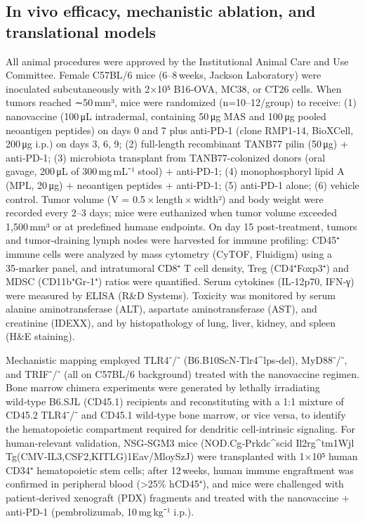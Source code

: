 \documentclass{article}
\begin{document}
\subsection{In vivo efficacy, mechanistic ablation, and translational models}
All animal procedures were approved by the Institutional Animal Care and Use Committee. Female C57BL/6 mice (6–8 weeks, Jackson Laboratory) were inoculated subcutaneously with 2×10⁵ B16‑OVA, MC38, or CT26 cells. When tumors reached ∼50 mm³, mice were randomized (n=10–12/group) to receive: (1) nanovaccine (100 μL intradermal, containing 50 μg MAS and 100 μg pooled neoantigen peptides) on days 0 and 7 plus anti‑PD‑1 (clone RMP1‑14, BioXCell, 200 μg i.p.) on days 3, 6, 9; (2) full‑length recombinant TANB77 pilin (50 μg) + anti‑PD‑1; (3) microbiota transplant from TANB77-colonized donors (oral gavage, 200 μL of 300 mg mL⁻¹ stool) + anti‑PD‑1; (4) monophosphoryl lipid A (MPL, 20 μg) + neoantigen peptides + anti‑PD‑1; (5) anti‑PD‑1 alone; (6) vehicle control. Tumor volume (V = 0.5 × length × width²) and body weight were recorded every 2–3 days; mice were euthanized when tumor volume exceeded 1,500 mm³ or at predefined humane endpoints. On day 15 post‑treatment, tumors and tumor‑draining lymph nodes were harvested for immune profiling: CD45⁺ immune cells were analyzed by mass cytometry (CyTOF, Fluidigm) using a 35‑marker panel, and intratumoral CD8⁺ T cell density, Treg (CD4⁺Foxp3⁺) and MDSC (CD11b⁺Gr‑1⁺) ratios were quantified. Serum cytokines (IL‑12p70, IFN‑γ) were measured by ELISA (R&D Systems). Toxicity was monitored by serum alanine aminotransferase (ALT), aspartate aminotransferase (AST), and creatinine (IDEXX), and by histopathology of lung, liver, kidney, and spleen (H\&E staining).

Mechanistic mapping employed TLR4⁻/⁻ (B6.B10ScN‑Tlr4^{lps‑del}), MyD88⁻/⁻, and TRIF⁻/⁻ (all on C57BL/6 background) treated with the nanovaccine regimen. Bone marrow chimera experiments were generated by lethally irradiating wild‑type B6.SJL (CD45.1) recipients and reconstituting with a 1:1 mixture of CD45.2 TLR4⁻/⁻ and CD45.1 wild‑type bone marrow, or vice versa, to identify the hematopoietic compartment required for dendritic cell‑intrinsic signaling. For human‑relevant validation, NSG‑SGM3 mice (NOD.Cg‑Prkdc^{scid} Il2rg^{tm1Wjl} Tg(CMV‑IL3,CSF2,KITLG)1Eav/MloySzJ) were transplanted with 1×10⁵ human CD34⁺ hematopoietic stem cells; after 12 weeks, human immune engraftment was confirmed in peripheral blood (>25\% hCD45⁺), and mice were challenged with patient‑derived xenograft (PDX) fragments and treated with the nanovaccine + anti‑PD‑1 (pembrolizumab, 10 mg kg⁻¹ i.p.).
\end{document}
